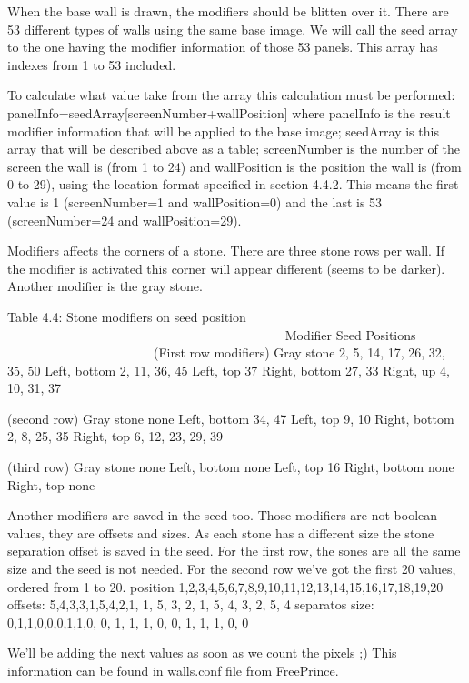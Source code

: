  When the base wall is drawn, the modifiers should be blitten over it.
 There are 53 different types of walls using the same base image.
 We will call the seed array to the one having the modifier information of
 those 53 panels. This array has indexes from 1 to 53 included.

 To calculate what value take from the array this calculation must be
 performed: panelInfo=seedArray[screenNumber+wallPosition]
 where panelInfo is the result modifier information that will be applied to
 the base image; seedArray is this array that will be described above as a
 table; screenNumber is the number of the screen the wall is (from 1 to 24)
 and wallPosition is the position the wall is (from 0 to 29), using the
 location format specified in section 4.4.2. This means the first value is
 1 (screenNumber=1 and wallPosition=0) and the last is 53 (screenNumber=24
 and wallPosition=29).

 Modifiers affects the corners of a stone. There are three stone rows per
 wall. If the modifier is activated this corner will appear different
 (seems to be darker). Another modifier is the gray stone.

                   Table 4.4: Stone modifiers on seed position
                   ~~~~~~~~~~~~~~~~~~~~~~~~~~~~~~~~~~~~~~~~~~~
  Modifier       Seed Positions
	~~~~~~~~       ~~~~ ~~~~~~~~~
     (First row modifiers)
  Gray stone     2, 5, 14, 17, 26, 32, 35, 50
  Left, bottom   2, 11, 36, 45
  Left, top      37
  Right, bottom  27, 33
  Right, up      4, 10, 31, 37

     (second row)
  Gray stone     none 
  Left, bottom   34, 47
  Left, top      9, 10
  Right, bottom  2, 8, 25, 35
  Right, top     6, 12, 23, 29, 39

     (third row)
  Gray stone     none 
  Left, bottom   none
  Left, top      16
  Right, bottom  none
  Right, top     none

 Another modifiers are saved in the seed too. Those modifiers are not
 boolean values, they are offsets and sizes. As each stone has a different
 size the stone separation offset is saved in the seed.
 For the first row, the sones are all the same size and the seed is not
 needed.
 For the second row we've got the first 20 values, ordered from 1 to 20. 
 position        1,2,3,4,5,6,7,8,9,10,11,12,13,14,15,16,17,18,19,20
 offsets:        5,4,3,3,1,5,4,2,1, 1, 5, 3, 2, 1, 5, 4, 3, 2, 5, 4
 separatos size: 0,1,1,0,0,0,1,1,0, 0, 1, 1, 1, 0, 0, 1, 1, 1, 0, 0

 We'll be adding the next values as soon as we count the pixels ;)
 This information can be found in walls.conf file from FreePrince.

